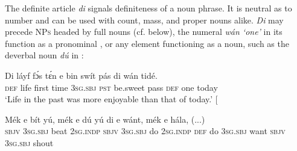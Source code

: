 \begin{table}
\caption{Characteristics of definiteness marking}
\label{tab:key:5.1}
\end{table}
The definite article \textit{di} signals definiteness of a noun phrase. It is neutral as to number and can be used with count, mass, and proper nouns alike. \textit{Di} may precede \textsc{NPs} headed by full nouns (cf.  below), the numeral \textit{wán ‘one’} in its function as a pronominal , or any element functioning as a noun, such as the deverbal noun \textit{dú} in \textsc{:} 


\ea%
    \label{ex:key:165}
    \gll Di  láyf  fɔ́s  tɛ́n    e    bin  swít    pás    di  wán    tidé.\\
\textsc{def}  life  first  time    \textsc{3sg.sbj}  \textsc{pst}  be.sweet  pass    \textsc{def}  one    today\\

\glt ‘Life in the past was more enjoyable than that of today.’ [\textstylePichiexamplenumberZchnZchn{ab03ay 104]}
\z


\ea%
    \label{ex:key:166}
    \gll Mék    e    bít    yú,    mék    e    dú  yú    di   e    wánt,  mék    e    hála,  (...)\\
\textsc{sbjv}    \textsc{3sg.sbj}  beat    \textsc{2sg.indp}  \textsc{sbjv}    \textsc{3sg.sbj}  do  \textsc{2sg.indp}  \textsc{def}  do
\textsc{3sg.sbj}  want  \textsc{sbjv}    \textsc{3sg.sbj}  shout\\

